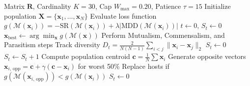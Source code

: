 \documentclass[11pt,a4paper]{article}
\begin{document}
\begin{algorithm}[htbp]
\caption{AOBL-SOS Institutional Portfolio Optimization}\label{alg:aobl_sos}
\small
\begin{algorithmic}[1]
\Require Matrix $\mathbf{R}$, Cardinality $K=30$, Cap $W_{\max}=0.20$, Patience $\tau=15$
\State Initialize population $\mathbf{X} = \{\mathbf{x}_1, \dots, \mathbf{x}_N\}$
\State Evaluate loss function $g(\mathcal{M}(\mathbf{x}_i)) = -\text{SR}(\mathcal{M}(\mathbf{x}_i)) + \lambda |\text{MDD}(\mathcal{M}(\mathbf{x}_i))|$
\State $t \gets 0, \, S_t \gets 0$
    \State $\mathbf{x}_{\text{best}} \gets \arg\min_{\mathbf{x}} g(\mathcal{M}(\mathbf{x}))$
        \State Perform Mutualism, Commensalism, and Parasitism steps
    \EndFor
    \State Track diversity $D_t = \frac{2}{N(N-1)} \sum_{i < j} \|\mathbf{x}_i - \mathbf{x}_j\|_2$
        \State $S_t \gets 0$
    \Else
        \State $S_t \gets S_t + 1$
    \EndIf
        \State Compute population centroid $\mathbf{c} = \frac{1}{N}\sum \mathbf{x}_i$
        \State Generate opposite vectors $\mathbf{x}_{i, \, \text{opp}} = \mathbf{c} + \gamma(\mathbf{c} - \mathbf{x}_i)$ for worst 50\%
        \State Replace hosts if $g(\mathcal{M}(\mathbf{x}_{i, \, \text{opp}})) < g(\mathcal{M}(\mathbf{x}_i))$
        \State $S_t \gets 0$
    \EndIf
\EndWhile
\end{algorithmic}
\end{algorithm}
\end{document}
